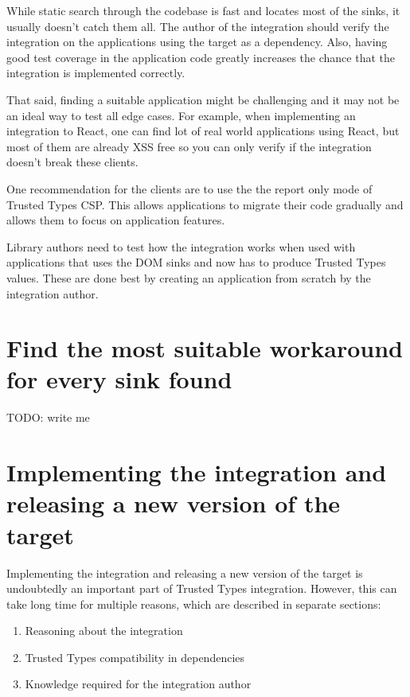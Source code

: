 While static search through the codebase is fast and locates most of the sinks, it usually doesn't
catch them all. The author of the integration should verify the integration on the applications
using the target as a dependency. Also, having good test coverage in the application code greatly
increases the chance that the integration is implemented correctly.

That said, finding a suitable application might be challenging and it may not be an ideal way to
test all edge cases. For example, when implementing an integration to React, one can find lot of
real world applications using React, but most of them are already XSS free so you can only verify if
the integration doesn't break these clients.

One recommendation for the clients are to use the the report only mode of Trusted Types CSP. This
allows applications to migrate their code gradually and allows them to focus on application
features.

Library authors need to test how the integration works when used with applications that uses the
DOM sinks and now has to produce Trusted Types values. These are done best by creating an
application from scratch by the integration author.

\section{Find the most suitable workaround for every sink found}

TODO: write me

\section{Implementing the integration and releasing a new version of the target}

Implementing the integration and releasing a new version of the target is undoubtedly an important part
of Trusted Types integration. However, this can take long time for multiple reasons, which are
described in separate sections:

\begin{enumerate}
  \item Reasoning about the integration
  \item Trusted Types compatibility in dependencies
  \item Knowledge required for the integration author
\end{enumerate}

